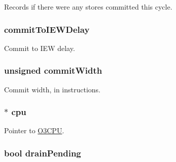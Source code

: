 \label{classDefaultCommit_a0fd9fcb6eed99c11c7fa61c7218ecf49}
Records if there were any stores committed this cycle. \hypertarget{classDefaultCommit_a6b6fe1148ed7c40758e45f351c375552}{
\subsubsection[{commitToIEWDelay}]{ {\bf commitToIEWDelay}}}
\label{classDefaultCommit_a6b6fe1148ed7c40758e45f351c375552}
Commit to IEW delay. \hypertarget{classDefaultCommit_aeab15260a0ccc0ea470bb74344b63d17}{
\subsubsection[{commitWidth}]{\setlength{\rightskip}{0pt plus 5cm}unsigned {\bf commitWidth}}}
\label{classDefaultCommit_aeab15260a0ccc0ea470bb74344b63d17}
Commit width, in instructions. \hypertarget{classDefaultCommit_a1379cf882a12ac6fc9eba5da7c84b18b}{
\subsubsection[{cpu}]{$\ast$ {\bf cpu}}}
\label{classDefaultCommit_a1379cf882a12ac6fc9eba5da7c84b18b}
Pointer to \hyperlink{namespaceO3CPU}{O3CPU}. \hypertarget{classDefaultCommit_a547316e5bf0dc6115209737cf68e9bb8}{
\subsubsection[{drainPending}]{\setlength{\rightskip}{0pt plus 5cm}bool {\bf drainPending}}}
\label{classDefaultCommit_a547316e5bf0dc6115209737cf68e9bb8}
